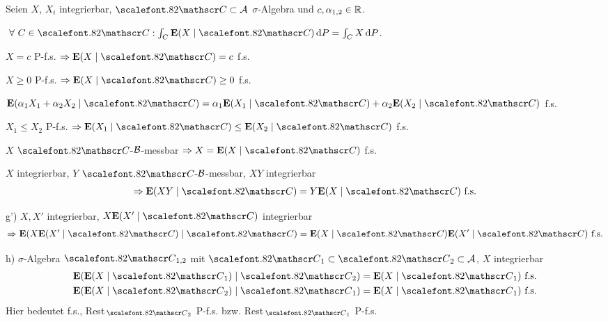 \begin{prop}
\label{prop:10.2}
Seien $X$, $X_{i}$ integrierbar, ${\CC} \subset
{\AA}$ $\sigma$-Algebra und $c,\alpha _{1,2} \in \mathbb{R}$.
\begin{propenum}
\item\label{prop:10.2:1} $\forall {C\in {\CC}} : \int_{C}  \E(X\mid {\CC})\dP =
\int_{C} X\dP$.
\item\label{prop:10.2:2}
$X=c$ P-f.s. $\Rightarrow \E(X\mid {\CC})=c$ f.s.
\item\label{prop:10.2:3}
$X\geq 0$ P-f.s. $\Rightarrow \E(X\mid {\CC}) \geq 0$ f.s.
\item $\E(\alpha _{1} X_{1} +\alpha _{2} X_{2} \mid {\CC}) = \alpha _{1}
  \E(X_{1} \mid {\CC})+\alpha _{2}\E (X_{2} \mid {\CC})$ f.s.
\item\label{prop:10.2:4}
$X_{1} \leq X_{2} $ P-f.s. $\Rightarrow \E(X_{1} \mid {\CC})\leq \E(X_{2}
\mid {\CC})$ f.s.
\item\label{prop:10.2:5}
$X$ ${\CC}$-${\mathcal{B}}$-messbar $\Rightarrow X=\E(X\mid {\CC})$ f.s.
\item\label{prop:10.2:6}
$X$ integrierbar, $Y$ ${\CC}$-${\mathcal{B}}$-messbar, $XY$ integrierbar
\begin{align*}
\Rightarrow \E(XY\mid {\CC})= Y\E (X\mid {\CC}) \fs
\end{align*}
\item[g')]\label{prop:10.2:6a}
$X,X'$ integrierbar, $X\E(X'\mid {\CC})$ integrierbar
\begin{align*}
\Rightarrow \E(X\E(X'\mid {\CC})\mid {\CC})=\E( X\mid {\CC})\E(X'\mid
{\CC})\fs
\end{align*}
\item[h)]\label{prop:10.2:7} $\sigma$-Algebra ${\CC}_{1,2}$ mit ${\CC}_{1}
\subset {\CC}_{2} \subset {\AA}$, $X$ integrierbar
\begin{align*}
&\E(\E(X\mid {\CC}_{1})\mid {\CC}_{2})=\E(X\mid{\CC}_{1})\fs\\
&\E(\E(X\mid {\CC}_{2})\mid {\CC}_{1})=\E(X\mid{\CC}_{1})\fs
\end{align*}
Hier bedeutet f.s., Rest$\,_{{\CC}_{2}}$ P-f.s. bzw.
Rest$\,_{{\CC}_{1}}$ P-f.s.\fishhere
\end{propenum}
\end{prop}
